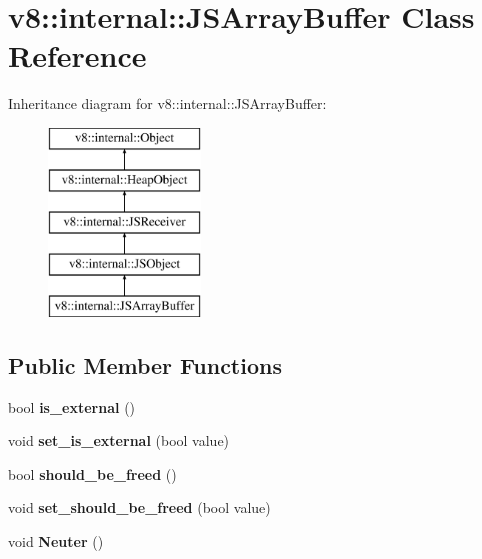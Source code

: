 \hypertarget{classv8_1_1internal_1_1_j_s_array_buffer}{}\section{v8\+:\+:internal\+:\+:J\+S\+Array\+Buffer Class Reference}
\label{classv8_1_1internal_1_1_j_s_array_buffer}
Inheritance diagram for v8\+:\+:internal\+:\+:J\+S\+Array\+Buffer\+:\begin{figure}[H]
\begin{center}
\leavevmode
\includegraphics[height=5.000000cm]{classv8_1_1internal_1_1_j_s_array_buffer}
\end{center}
\end{figure}
\subsection*{Public Member Functions}
\begin{DoxyCompactItemize}
\item 
\hypertarget{classv8_1_1internal_1_1_j_s_array_buffer_acd0c35e190788e74f8105b7eded84a21}{}bool {\bfseries is\+\_\+external} ()\label{classv8_1_1internal_1_1_j_s_array_buffer_acd0c35e190788e74f8105b7eded84a21}

\item 
\hypertarget{classv8_1_1internal_1_1_j_s_array_buffer_a712eb4848bdc218af39f2d74c87a3a9e}{}void {\bfseries set\+\_\+is\+\_\+external} (bool value)\label{classv8_1_1internal_1_1_j_s_array_buffer_a712eb4848bdc218af39f2d74c87a3a9e}

\item 
\hypertarget{classv8_1_1internal_1_1_j_s_array_buffer_a5797105faa332af4d53ffa45e15e528a}{}bool {\bfseries should\+\_\+be\+\_\+freed} ()\label{classv8_1_1internal_1_1_j_s_array_buffer_a5797105faa332af4d53ffa45e15e528a}

\item 
\hypertarget{classv8_1_1internal_1_1_j_s_array_buffer_a6fa0e3d445109605980eb7525dcb05a6}{}void {\bfseries set\+\_\+should\+\_\+be\+\_\+freed} (bool value)\label{classv8_1_1internal_1_1_j_s_array_buffer_a6fa0e3d445109605980eb7525dcb05a6}

\item 
\hypertarget{classv8_1_1internal_1_1_j_s_array_buffer_ab8aa5ae4495b3caf14dad14329d40fe6}{}void {\bfseries Neuter} ()\label{classv8_1_1internal_1_1_j_s_array_buffer_ab8aa5ae4495b3caf14dad14329d40fe6}

\end{DoxyCompactItemize}
